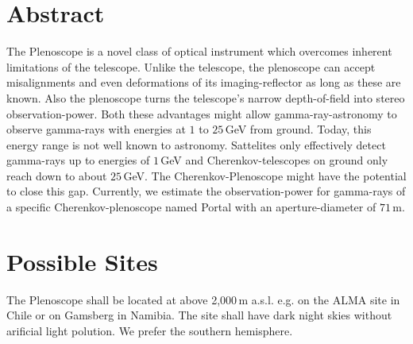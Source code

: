 \documentclass[11pt,a4paper,oneside,titlepage]{article}
\begin{document}
\section{Abstract}
%
The Plenoscope is a novel class of optical instrument which overcomes inherent limitations of the telescope.
%
Unlike the telescope, the plenoscope can accept misalignments and even deformations of its imaging-reflector as long as these are known.
%
Also the plenoscope turns the telescope's narrow depth-of-field into stereo observation-power.
%
Both these advantages might allow gamma-ray-astronomy to observe gamma-rays with energies at $1$ to $25\,$GeV from ground.
%
Today, this energy range is not well known to astronomy.
%
Sattelites only effectively detect gamma-rays up to energies of $1\,$GeV and Cherenkov-telescopes on ground only reach down to about $25\,$GeV.
%
The Cherenkov-Plenoscope might have the potential to close this gap.
%
Currently, we estimate the observation-power for gamma-rays of a specific Cherenkov-plenoscope named Portal with an aperture-diameter of $71\,$m.
%
\section{Possible Sites}
%
The Plenoscope shall be located at above 2,000\,m a.s.l. e.g. on the ALMA site in Chile or on Gamsberg in Namibia.
%
The site shall have dark night skies without arificial light polution.
%
We prefer the southern hemisphere.
\end{document}
